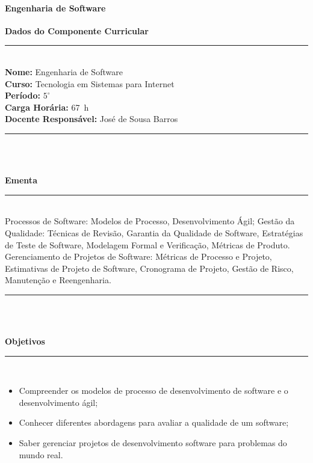 \paragraph{Engenharia de Software}

\begin{center}\textbf{Dados do Componente Curricular}\end{center}
\vspace{-5mm}
\noindent\rule{16.5cm}{0.4pt}
\\
\textbf{Nome:} Engenharia de Software
\\
\textbf{Curso:} Tecnologia em Sistemas para Internet
\\ 
\textbf{Período:} $5^{\circ}$ 
\\
\textbf{Carga Horária:} 67~h 
\\ 
\textbf{Docente Responsável:} José de Sousa Barros 
\\ 
\noindent\rule{16.5cm}{0.4pt}\\
\\
\vspace{-12mm}
\begin{center}\textbf{Ementa}\end{center}
\vspace{-5mm}
\noindent\rule{16.5cm}{0.4pt}
\\
Processos de Software: Modelos de Processo, Desenvolvimento Ágil;
Gestão da Qualidade: Técnicas de Revisão, Garantia da Qualidade de Software, Estratégias de Teste de Software, Modelagem Formal e Verificação, Métricas de Produto. Gerenciamento de Projetos de Software: Métricas de Processo e Projeto, Estimativas de Projeto de Software, Cronograma de Projeto, Gestão de Risco, Manutenção e Reengenharia. \\
\noindent\rule{16.5cm}{0.4pt}\\
\\
\vspace{-12mm}
\begin{center}\textbf{Objetivos}\end{center}
\vspace{-5mm}
\noindent\rule{16.5cm}{0.4pt}
\\
\begin{itemize}
\item Compreender os modelos de processo de desenvolvimento de software e o desenvolvimento ágil;
\item Conhecer diferentes abordagens para avaliar a qualidade de um software;
\item Saber gerenciar projetos de desenvolvimento software para problemas do mundo real.
\end{itemize}
